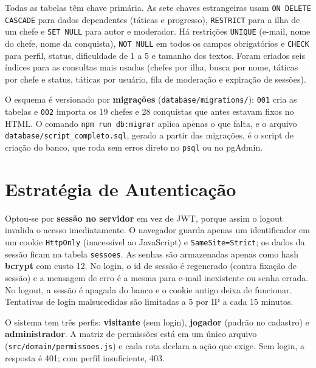 \documentclass[12pt,a4paper]{article}
\newcommand{\cod}[1]{\texttt{#1}}
\begin{document}
Todas as tabelas têm chave primária. As sete chaves estrangeiras usam
\cod{ON DELETE CASCADE} para dados dependentes (táticas e progresso),
\cod{RESTRICT} para a ilha de um chefe e \cod{SET NULL} para autor e moderador.
Há restrições \cod{UNIQUE} (e-mail, nome do chefe, nome da conquista),
\cod{NOT NULL} em todos os campos obrigatórios e \cod{CHECK} para perfil,
status, dificuldade de 1 a 5 e tamanho dos textos. Foram criados seis índices
para as consultas mais usadas (chefes por ilha, busca por nome, táticas por chefe
e status, táticas por usuário, fila de moderação e expiração de sessões).

O esquema é versionado por \textbf{migrações} (\cod{database/migrations/}):
\cod{001} cria as tabelas e \cod{002} importa os 19 chefes e 28 conquistas que
antes estavam fixos no HTML. O comando \cod{npm run db:migrar} aplica apenas o
que falta, e o arquivo \cod{database/script\_completo.sql}, gerado a partir das
migrações, é o script de criação do banco, que roda sem erros direto no
\cod{psql} ou no pgAdmin.

\section{Estratégia de Autenticação}

Optou-se por \textbf{sessão no servidor} em vez de JWT, porque assim o logout
invalida o acesso imediatamente. O navegador guarda apenas um identificador em
um cookie \cod{HttpOnly} (inacessível ao JavaScript) e \cod{SameSite=Strict}; os
dados da sessão ficam na tabela \cod{sessoes}. As senhas são armazenadas apenas
como hash \textbf{bcrypt} com custo 12. No login, o id de sessão é regenerado
(contra fixação de sessão) e a mensagem de erro é a mesma para e-mail inexistente
ou senha errada. No logout, a sessão é apagada do banco e o cookie antigo deixa
de funcionar. Tentativas de login malsucedidas são limitadas a 5 por IP a cada
15 minutos.

O sistema tem três perfis: \textbf{visitante} (sem login), \textbf{jogador}
(padrão no cadastro) e \textbf{administrador}. A matriz de permissões está em um
único arquivo (\cod{src/domain/permissoes.js}) e cada rota declara a ação que
exige. Sem login, a resposta é 401; com perfil insuficiente, 403.
\end{document}
